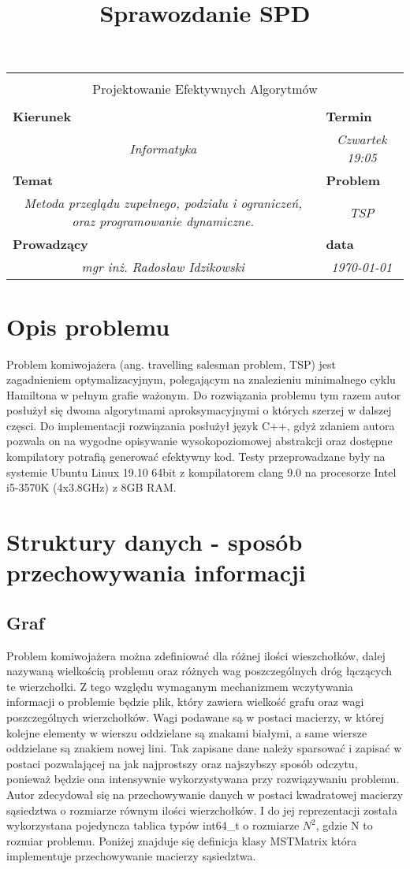 \documentclass[polish,polish,a4paper]{article}
\title{Sprawozdanie SPD}
\newcommand{\name}[1]{\sffamily\bfseries\scriptsize #1}
\newcommand{\frontpage}[8]{

\vspace{2cm}

\begin{tabular}{|p{0.72\textwidth}|p{0.28\textwidth}|}
\hline
\multicolumn{2}{|c|}{}\\
\multicolumn{2}{|c|}{{\LARGE #1}}\\
\multicolumn{2}{|c|}{}\\
\hline
\name{Kierunek} & \name{Termin}\\
\multicolumn{1}{|c|}{\textit{#2}} & \multicolumn{1}{|c|}{\textit{#3}} \\
\hline
\name{Temat} & \name{Problem}\\
\multicolumn{1}{|c|}{\textit{#4}} & \multicolumn{1}{|c|}{\textit{#5}} \\
\hline
\name{Prowadzący} & \name{data}\\
\multicolumn{1}{|c|}{\textit{mgr inż. Radosław Idzikowski}} & \multicolumn{1}{|c|}{\textit{#6}} \\
\hline
\end{tabular}

}
\begin{document}
\frontpage{Projektowanie Efektywnych Algorytmów}{Informatyka}{Czwartek 19:05}{Metoda przeglądu zupełnego, podzialu i ograniczeń, oraz programowanie dynamiczne.}{TSP}{\today}
\pagestyle{empty}
\newpage

\section{Opis problemu}

Problem komiwojażera (ang. travelling salesman problem, TSP) jest zagadnieniem optymalizacyjnym, polegającym na znalezieniu minimalnego cyklu Hamiltona w pełnym grafie ważonym\cite{TSPWiki:1}. Do rozwiązania problemu tym razem autor posłużył się dwoma algorytmami aproksymacyjnymi o których szerzej w dalszej częsci.
Do implementacji rozwiązania posłużył język C++, gdyż zdaniem autora pozwala on na wygodne opisywanie wysokopoziomowej abstrakcji oraz dostępne kompilatory
potrafią generować efektywny kod. Testy przeprowadzane były na systemie Ubuntu Linux 19.10 64bit z kompilatorem clang 9.0 na procesorze Intel i5-3570K (4x3.8GHz) z 8GB RAM.

\section{Struktury danych - sposób przechowywania informacji}

\subsection{Graf}

Problem komiwojażera można zdefiniować dla różnej ilości wieszchołków, dalej nazywaną wielkością problemu oraz różnych wag poszczególnych dróg łączących te wierzchołki.
Z tego względu wymaganym mechanizmem wczytywania informacji o problemie będzie plik, który zawiera wielkość grafu oraz wagi poszczególnych wierzchołków.
Wagi podawane są w postaci macierzy, w której kolejne elementy w wierszu oddzielane są znakami białymi, a same wiersze oddzielane są znakiem nowej lini.
Tak zapisane dane należy sparsować i zapisać w postaci pozwalającej na jak najprostszy oraz najszybszy sposób odczytu, ponieważ będzie ona intensywnie wykorzystywana przy rozwiązywaniu problemu.
Autor zdecydował się na przechowywanie danych w postaci kwadratowej macierzy sąsiedztwa o rozmiarze równym ilości wierzchołków.
I do jej reprezentacji została wykorzystana pojedyncza tablica typów int64\_t o rozmiarze $N^{2}$, gdzie N to rozmiar problemu.
Poniżej znajduje się definicja klasy MSTMatrix która implementuje przechowywanie macierzy sąsiedztwa.
\end{document}
